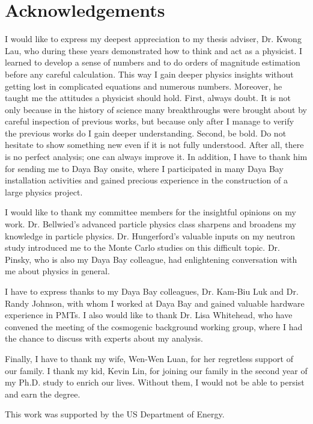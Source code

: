 \chapter*{\centering Acknowledgements}
I would like to express my deepest appreciation to my thesis adviser, Dr. Kwong Lau, who during these years demonstrated how to think and act as a physicist. I learned to develop a sense of numbers and to do orders of magnitude estimation before any careful calculation. This way I gain deeper physics insights without getting lost in complicated equations and numerous numbers. Moreover, he taught me the attitudes a physicist should hold. First, always doubt. It is not only because in the history of science many breakthroughs were brought about by careful inspection of previous works, but because only after I manage to verify the previous works do I gain deeper understanding. Second, be bold. Do not hesitate to show something new even if it is not fully understood. After all, there is no perfect analysis; one can always improve it. In addition, I have to thank him for sending me to Daya Bay onsite, where I participated in many Daya Bay installation activities and gained precious experience in the construction of a large physics project.

I would like to thank my committee members for the insightful opinions on my work. Dr. Bellwied's advanced particle physics class sharpens and broadens my knowledge in particle physics. Dr. Hungerford's valuable inputs on my neutron study introduced me to the Monte Carlo studies on this difficult topic. Dr. Pinsky, who is also my Daya Bay colleague, had enlightening conversation with me about physics in general.

I have to express thanks to my Daya Bay colleagues, Dr. Kam-Biu Luk and Dr. Randy Johnson, with whom I worked at Daya Bay and gained valuable hardware experience in PMTs. I also would like to thank Dr. Lisa Whitehead, who have convened the meeting of the cosmogenic background working group, where I had the chance to discuss with experts about my analysis.

Finally, I have to thank my wife, Wen-Wen Luan, for her regretless support of our family. I thank my kid, Kevin Lin, for joining our family in the second year of my Ph.D. study to enrich our lives. Without them, I would not be able to persist and earn the degree.

This work was supported by the US Department of Energy.
\newpage